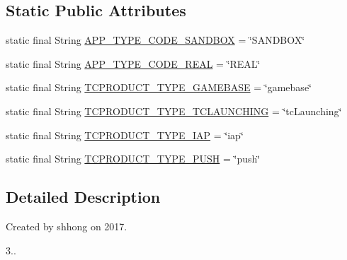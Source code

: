\subsection*{Static Public Attributes}
\begin{DoxyCompactItemize}
\item 
static final String \hyperlink{classcom_1_1toast_1_1android_1_1gamebase_1_1launching_1_1data_1_1_launching_info_a5ba5d878cb73e1c090f843e85b2a6904}{A\+P\+P\+\_\+\+T\+Y\+P\+E\+\_\+\+C\+O\+D\+E\+\_\+\+S\+A\+N\+D\+B\+OX} = \char`\"{}S\+A\+N\+D\+B\+OX\char`\"{}
\item 
static final String \hyperlink{classcom_1_1toast_1_1android_1_1gamebase_1_1launching_1_1data_1_1_launching_info_a994894cdc073f9f1a50e60ada7114735}{A\+P\+P\+\_\+\+T\+Y\+P\+E\+\_\+\+C\+O\+D\+E\+\_\+\+R\+E\+AL} = \char`\"{}R\+E\+AL\char`\"{}
\item 
static final String \hyperlink{classcom_1_1toast_1_1android_1_1gamebase_1_1launching_1_1data_1_1_launching_info_a4fbe966df1c56b729cc1d32fe7c1ff01}{T\+C\+P\+R\+O\+D\+U\+C\+T\+\_\+\+T\+Y\+P\+E\+\_\+\+G\+A\+M\+E\+B\+A\+SE} = \char`\"{}gamebase\char`\"{}
\item 
static final String \hyperlink{classcom_1_1toast_1_1android_1_1gamebase_1_1launching_1_1data_1_1_launching_info_ad60da783f693784ae720929f4e983121}{T\+C\+P\+R\+O\+D\+U\+C\+T\+\_\+\+T\+Y\+P\+E\+\_\+\+T\+C\+L\+A\+U\+N\+C\+H\+I\+NG} = \char`\"{}tc\+Launching\char`\"{}
\item 
static final String \hyperlink{classcom_1_1toast_1_1android_1_1gamebase_1_1launching_1_1data_1_1_launching_info_a35c254fe646d3c0c383b171d062dfefe}{T\+C\+P\+R\+O\+D\+U\+C\+T\+\_\+\+T\+Y\+P\+E\+\_\+\+I\+AP} = \char`\"{}iap\char`\"{}
\item 
static final String \hyperlink{classcom_1_1toast_1_1android_1_1gamebase_1_1launching_1_1data_1_1_launching_info_a363ed2a76c96a788962bab33a85cdf0b}{T\+C\+P\+R\+O\+D\+U\+C\+T\+\_\+\+T\+Y\+P\+E\+\_\+\+P\+U\+SH} = \char`\"{}push\char`\"{}
\end{DoxyCompactItemize}


\subsection{Detailed Description}
Created by shhong on 2017. 


\begin{DoxyEnumerate}
\item 3.. 
\end{DoxyEnumerate}


